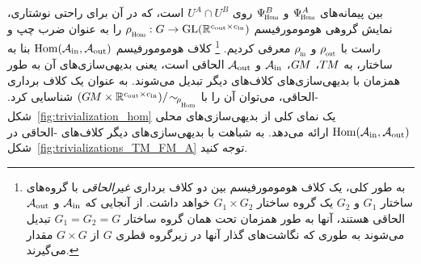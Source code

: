 بین پیمانه‌های $\PsiHom^A$ و $\PsiHom^B$ روی $U^A\cap U^B$ است، که در آن برای راحتی نوشتاری، نمایش گروهی هومومورفیسم $\rhoHom:G\to\GL{\R^{\cout\times\cin}}$ را به عنوان ضرب چپ و راست با $\rhoout$ و $\rhoin$ معرفی کردیم.%
\footnote{
    به طور کلی، یک کلاف هومومورفیسم بین دو کلاف برداری \emph{غیرالحاقی} با گروه‌های ساختار $G_1$ و $G_2$ یک گروه ساختار $G_1\times G_2$ خواهد داشت.
    از آنجایی که $\mathcal{A}_\textup{in}$ و $\mathcal{A}_\textup{out}$ الحاقی هستند، آنها به طور همزمان تحت همان گروه ساختار $G_1=G_2=G$ تبدیل می‌شوند به طوری که نگاشت‌های گذار آنها در زیرگروه قطری $G$ از $G\times G$ مقدار می‌گیرند.
}
کلاف هومومورفیسم $\operatorname{Hom}(\mathcal{A}_\textup{in},\mathcal{A}_\textup{out})$ بنا به ساختار، به $T\mkern-1.5muM$، $G\mkern-1.4muM$، $\mathcal{A}_\textup{in}$ و $\mathcal{A}_\textup{out}$ الحاقی است، یعنی بدیهی‌سازی‌های آن به طور همزمان با بدیهی‌سازی‌های کلاف‌های دیگر تبدیل می‌شوند.
به عنوان یک کلاف برداری -الحاقی، می‌توان آن را با $(\GM\times\R^{\cout\times\cin})/\!\sim_{\!\rhoHom}$ شناسایی کرد.
شکل~\ref{fig:trivialization_hom} یک نمای کلی از بدیهی‌سازی‌های محلی $\operatorname{Hom}(\mathcal{A}_\textup{in},\mathcal{A}_\textup{out})$ ارائه می‌دهد.
به شباهت با بدیهی‌سازی‌های دیگر کلاف‌های -الحاقی در شکل~\ref{fig:trivializations_TM_FM_A} توجه کنید.

